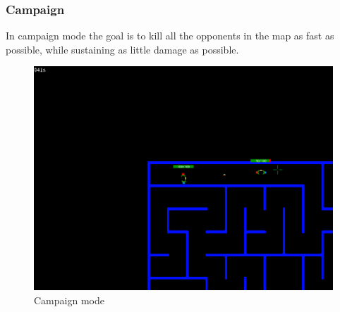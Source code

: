 \documentclass{article}
\theoremstyle{remark}
\begin{document}
\subsubsection{Campaign}
In campaign mode the goal is to kill all the opponents in the map as fast as possible, while sustaining as little damage as possible.
\begin{figure}[H] \centering
	\includegraphics[scale=0.45]{campaign01}
	\caption{Campaign mode}
\end{figure}
\pagebreak
\end{document}
